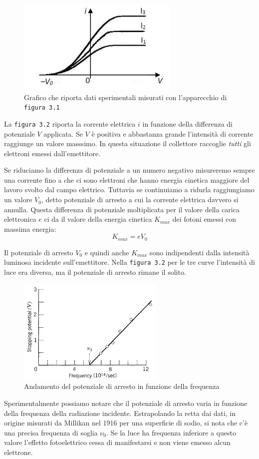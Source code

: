 \documentclass[12pt,twoside]{report}
\begin{document}
\begin{figure}[!h]
\centering
\includegraphics[width = 0.5\hsize]{./figures/potArr}
\caption{Grafico che riporta dati sperimentali misurati con l'apparecchio di \texttt{figura 3.1}}
\label{fig:logo}
\end{figure}

\par{La \texttt{figura 3.2} riporta la corrente elettrica $i$ in funzione della differenza di potenziale $V$ applicata. Se $V$ è positiva e abbastanza grande l'intensità di corrente raggiunge un valore masssimo. In questa situazione il collettore raccoglie \textit{tutti} gli elettroni emessi dall'emettitore.}
\par{Se riduciamo la differenza di potenziale a un numero negativo misureremo sempre una corrente fino a che ci sono elettroni che hanno energia cinetica maggiore del lavoro svolto dal campo elettrico. Tuttavia se continuiamo a ridurla raggiungiamo un valore $V_0$, detto potenziale di arresto a cui la corrente elettrica davvero si annulla. Questa differenza di potenziale moltiplicata per il valore della carica elettronica $e$ ci da il valore della energia cinetica $K_{max}$ dei fotoni emessi con massima energia:}
$$ K_{max} = e V_0 $$
\par{Il potenziale di arresto $V_0$ e quindi anche $K_{max}$ sono indipendenti dalla intensità luminosa incidente sull'emettitore. Nella \texttt{figura 3.2} per le tre curve l'intensità di luce era diversa, ma il potenziale di arresto rimane il solito.}

\begin{figure}[!h]
\centering
\includegraphics[width = 0.5\hsize]{./figures/stopPot}
\caption{Andamento del potenziale di arresto in funzione della frequenza}
\label{fig:logo}
\end{figure}
\par{Sperimentalmente possiamo notare che il potenziale di arresto varia in funzione della frequenza della radiazione incidente. Estrapolando la retta dai dati, in origine misurati da Millikan nel 1916 per una superficie di sodio, si nota che c'è una precisa frequenza di soglia $\nu_0$. Se la luce ha frequenza inferiore a questo valore l'effetto fotoelettrico cessa di manifestarsi e non viene emesso alcun elettrone.}
\end{document}
